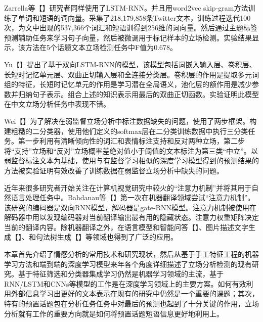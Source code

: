 Zarrella等【】研究者同样使用了LSTM-RNN。并且用word2vec skip-gram方法训练了单词和短语的词向量。采集了218,179,858条Twitter文本，训练过程迭代100次，为文中出现的537,366个词汇和短语训得到256维的词向量。然后通过主题标签预测辅助任务来学习句子向量，然后被微调用于标记样本的立场检测。实验结果显示，该方法在5个话题文本立场检测任务中F值为0.678。

Yu【】提出了基于双向LSTM-RNN的模型，该模型包括词嵌入输入层、卷积层、长短时记忆单元层、双曲正切输入层和全连接分类层。卷积层的作用是提取多元词组的特征，长短时记忆单元的作用是学习潜在全局语义，池化层的额作用是减少参数并归纳句子表示。组合上述的知识表示用最后的双曲正切函数。实验证明此模型在中文立场分析任务中表现不错。

Wei【】为了解决在弱监督立场分析中标注数据缺失的问题，使用了两步框架。构建粗糙的二分类器，使用他们定义的softmax层在二分类训练数据中执行三分类任务。第一步利用有清晰倾向性的词汇和表情标注支持和反对两种立场，第二步将“支持”立场和“反对”立场概率差绝对值小于阈值的文本标注为第三类“中立”。以弱监督标注文本为基础，使用与有监督学习相似的深度学习模型得到的预测结果的方法被实验证明有效改善了训练数据在弱监督立场分析中缺失的问题。

近年来很多研究者开始关注在计算机视觉研究中较火的“注意力机制”并将其用于自然语言处理任务中。Bahdanau等【】第一次在机器翻译领域尝试“注意力机制”。该研究的编码器是双向RNN模型，解码器是gate-RNN模型。注意力机制被使用在解码器中用以发现编码器对当前翻译输出最有用的隐藏状态。注意力权重矩阵决定当前的翻译内容。除机器翻译之外，在语言模型和智能问答【】、图片描述文字生成【】、和句法树生成【】等领域也得到了广泛的应用。




本章首先介绍了情感分析的常用技术和研究现状，然后从基于手工特征工程的机器学习方法和端到端的深度学习模型来年各个角度详细描述了立场分析检测的现有研究。基于特征筛选和分类器集成学习仍然是机器学习领域的主流，基于RNN/LSTM和CNNs等模型的工作是在深度学习领域上的主要方案。如何有效利用外部信息学习出更好的文本表示在现有的研究中仍然是一个重要的课题；其次，特有的预置话题包在分析任务任务中对最后的预测也起到了十分关键的作用，立场分析就有工作的重要方向就是如何将预置话题短语信息更好地利用上。